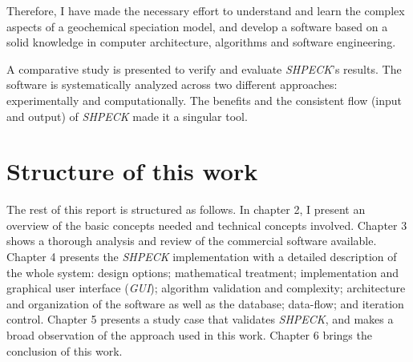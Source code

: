 Therefore, I have made the necessary effort to understand and learn the complex aspects of a geochemical speciation model, and develop a software based on a solid knowledge in computer architecture, algorithms and software engineering. 

A comparative study is presented to verify and evaluate \emph{SHPECK}'s results. The software is systematically analyzed across two different approaches: experimentally and computationally. The benefits and the consistent flow (input and output) of \emph{SHPECK} made it a singular tool. 

\section{Structure of this work}
The rest of this report is structured as follows. In chapter 2, I present an overview of the basic concepts needed and technical concepts involved. Chapter 3 shows a thorough analysis and review of the commercial software available. Chapter 4 presents the \emph{SHPECK} implementation with a detailed description of the whole system: design options; mathematical treatment; implementation and graphical user interface (\emph{GUI}); algorithm validation and complexity; architecture and organization of the software as well as the database; data-flow; and iteration control. Chapter 5 presents a study case that validates \emph{SHPECK}, and makes a broad observation of the approach used in this work. Chapter 6 brings the conclusion of this work.